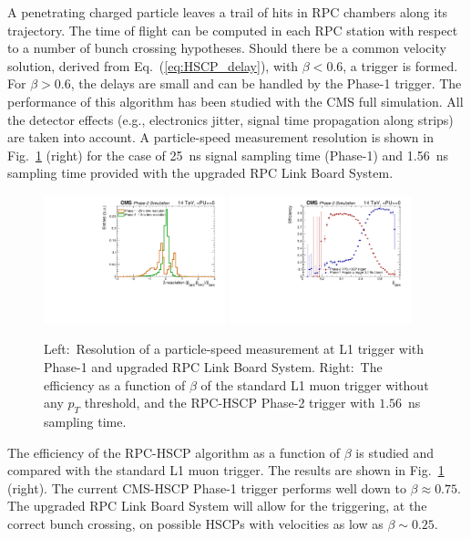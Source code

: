A penetrating charged particle leaves a trail of hits in RPC chambers along its trajectory. The time of flight can be computed in each RPC station with respect to a number of bunch crossing hypotheses. Should there be a common velocity solution, derived from Eq.~(\ref{eq:HSCP_delay}), with $\beta < 0.6$, a trigger is formed. For $\beta >0.6$, the delays are small and can be handled by the Phase-1 trigger. The performance of this algorithm has been studied with the CMS full simulation. All the detector effects (e.g., electronics jitter, signal time propagation along strips) are taken into account. A particle-speed measurement resolution is shown in Fig.~\ref{fig:HCP_Trigger} (right) for the case of 25~ns signal sampling time (Phase-1) and 1.56~ns sampling time provided with the upgraded RPC Link Board System.

\begin{figure}[t]
\begin{center}
  \includegraphics[width=0.47\textwidth]{figures/HSCP/beta_GenRes_2.pdf} \hfill
  \includegraphics[width=0.47\textwidth]{figures/HSCP/trigEff-Mu-HSCPTriggers.pdf}
  \caption{Left:~Resolution of a particle-speed measurement at L1 trigger with Phase-1 and upgraded RPC Link Board System. Right:~The efficiency as a function of $\beta$ of the standard L1 muon trigger without any $p_T$ threshold, and the RPC-HSCP Phase-2 trigger with $1.56$~ns sampling time.}
  \label{fig:HCP_Trigger}
\end{center}
\end{figure}

The efficiency of the RPC-HSCP algorithm as a function of $\beta$ is studied and compared with the standard L1 muon trigger. The results are shown in Fig.~\ref{fig:HCP_Trigger} (right). The current CMS-HSCP Phase-1 trigger performs well down to $\beta \approx 0.75$. The upgraded RPC Link Board System will allow for the triggering, at the
correct bunch crossing, on possible HSCPs with velocities as low as $\beta \sim 0.25$.

